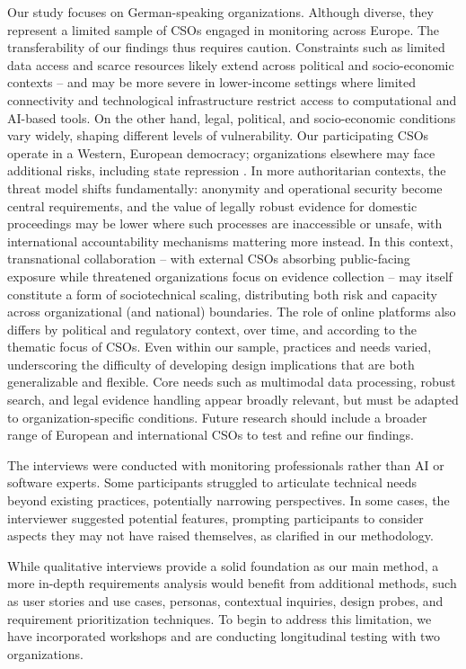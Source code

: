 \documentclass[acmsmall]{acmart}
\begin{document}
Our study focuses on German-speaking organizations. Although diverse, they represent a limited sample of CSOs engaged in monitoring across Europe. The transferability of our findings thus requires caution. Constraints such as limited data access and scarce resources likely extend across political and socio-economic contexts -- and may be more severe in lower-income settings where limited connectivity and technological infrastructure restrict access to computational and AI-based tools. On the other hand, legal, political, and socio-economic conditions vary widely, shaping different levels of vulnerability. Our participating CSOs operate in a Western, European democracy; organizations elsewhere may face additional risks, including state repression \cite{greig_civil_soc_2024}. In more authoritarian contexts, the threat model shifts fundamentally: anonymity and operational security become central requirements, and the value of legally robust evidence for domestic proceedings may be lower where such processes are inaccessible or unsafe, with international accountability mechanisms mattering more instead. In this context, transnational collaboration -- with external CSOs absorbing public-facing exposure while threatened organizations focus on evidence collection -- may itself constitute a form of sociotechnical scaling, distributing both risk and capacity across organizational (and national) boundaries.
The role of online platforms also differs by political and regulatory context, over time, and according to the thematic focus of CSOs. Even within our sample, practices and needs varied, underscoring the difficulty of developing design implications that are both generalizable and flexible. Core needs such as multimodal data processing, robust search, and legal evidence handling appear broadly relevant, but must be adapted to organization-specific conditions. Future research should include a broader range of European and international CSOs to test and refine our findings.

The interviews were conducted with monitoring professionals rather than AI or software experts. Some participants struggled to articulate technical needs beyond existing practices, potentially narrowing perspectives. In some cases, the interviewer suggested potential features, prompting participants to consider aspects they may not have raised themselves, as clarified in our methodology. 

While qualitative interviews provide a solid foundation as our main method, a more in-depth requirements analysis would benefit from additional methods, such as user stories and use cases, personas, contextual inquiries, design probes, and requirement prioritization techniques. To begin to address this limitation, we have incorporated workshops and are conducting longitudinal testing with two organizations.
\end{document}

